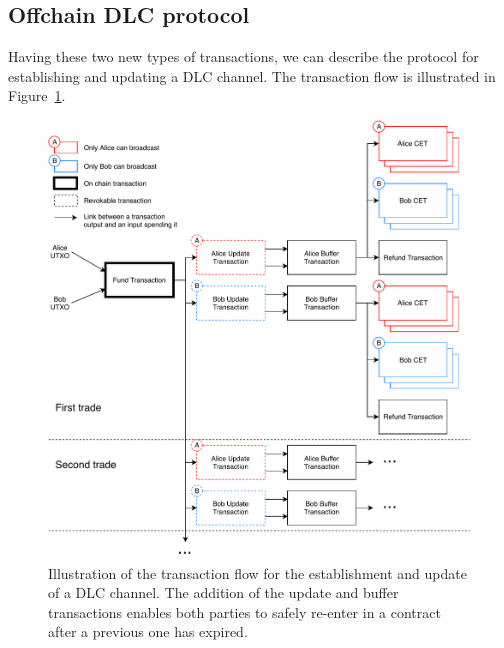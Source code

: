 \subsection{Offchain DLC protocol}\label{offdlcproto}
Having these two new types of transactions, we can describe the protocol for establishing and updating a DLC channel.
The transaction flow is illustrated in Figure~\ref{fig:full}.

\begin{figure}
  \centering
  \includegraphics[width=\textwidth]{Figures/fullOffChainDLC.pdf}
  \caption{Illustration of the transaction flow for the establishment and update of a DLC channel. The addition of the update and buffer transactions enables both parties to safely re-enter in a contract after a previous one has expired.}
  \label{fig:full}
\end{figure}

